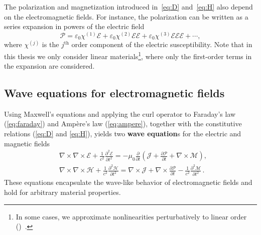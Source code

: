 The polarization and magnetization introduced in~\eqref{eq:D} and~\eqref{eq:H} also depend on the electromagnetic
fields. For instance, the
polarization can be written as a series expansion in powers of the electric
field
\begin{equation}\label{eq:polarization}
\bm{\mathcal{P}}=\mathcal{\varepsilon}_0 \bm{\mathcal{\chi}}^{(1)}
 \bm{\mathcal{E}}+\mathcal{\varepsilon}_0 \bm{\mathcal{\chi}}^{(2)}
 \bm{\mathcal{E}} \bm{\mathcal{E}}+\mathcal{\varepsilon}_0
 \bm{\mathcal{\chi}}^{(3)} \bm{\mathcal{E}} \bm{\mathcal{E}}
 \bm{\mathcal{E}}+\cdots,
\end{equation}
where $\bm{\mathcal{\chi}}^{(j)}$ is the $j^\text{th}$ order component of the
electric susceptibility. Note that in this thesis
we only consider linear materials\footnote{In some cases, we approximate nonlinearities perturbatively to linear
order ()~\cite{ownpub4}.}, where only the first-order terms in the expansion are
considered. \\

\subsection*{Wave equations for electromagnetic fields}

Using Maxwell's equations and applying the curl operator to Faraday's law
    (\eqref{eq:faraday}) and Ampère's law (\eqref{eq:ampere}),
together with the constitutive relations (\eqref{eq:D} and
        \eqref{eq:H}), yields two
\textbf{wave equation}s for the electric and magnetic fields
\begin{equation}
    \begin{aligned}
         & \nabla \times \nabla \times \bm{\mathcal{E}}+\frac{1}{c^2}
        \frac{\partial^2 \bm{\mathcal{E}}}{\partial t^2}=-\mu_0
        \frac{\partial}{\partial t}\left(\bm{\mathcal{J}}+\frac{\partial
        \bm{\mathcal{P}}}{\partial t}+\nabla \times \bm{\mathcal{M}}\right), \\
         & \nabla \times \nabla \times \bm{\mathcal{H}}+\frac{1}{c^2}
        \frac{\partial^2 \bm{\mathcal{H}}}{\partial t^2}=\nabla \times
        \bm{\mathcal{J}}+\nabla \times \frac{\partial \bm{\mathcal{P}}}{\partial
            t}-\frac{1}{c^2} \frac{\partial^2 \bm{\mathcal{M}}}{\partial t^2}\,.
    \end{aligned}
\end{equation}
These
equations encapsulate the wave-like behavior of electromagnetic fields and
hold for arbitrary material properties.

